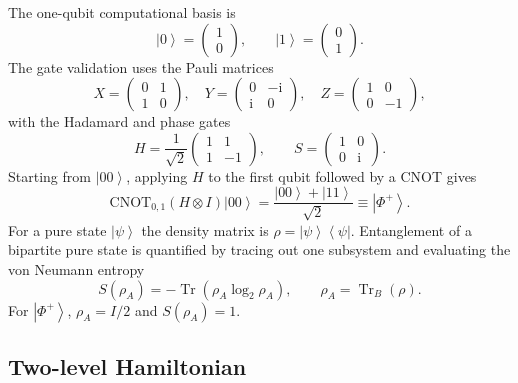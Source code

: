 \documentclass[10pt,a4paper]{article}
\newcommand{\ket}[1]{\left|#1\right\rangle}
\newcommand{\bra}[1]{\left\langle #1\right|}
\newcommand{\Tr}{\operatorname{Tr}}
\newcommand{\ii}{\mathrm{i}}
\begin{document}
The one-qubit computational basis is
\begin{equation}
\ket{0}=\begin{pmatrix}1\\0\end{pmatrix},\qquad \ket{1}=\begin{pmatrix}0\\1\end{pmatrix}.
\end{equation}
The gate validation uses the Pauli matrices
\begin{equation}
X=\begin{pmatrix}0&1\\1&0\end{pmatrix},\quad
Y=\begin{pmatrix}0&-\ii\\ \ii&0\end{pmatrix},\quad
Z=\begin{pmatrix}1&0\\0&-1\end{pmatrix},
\end{equation}
with the Hadamard and phase gates
\begin{equation}
H=\frac{1}{\sqrt{2}}\begin{pmatrix}1&1\\1&-1\end{pmatrix},\qquad
S=\begin{pmatrix}1&0\\0&\ii\end{pmatrix}.
\end{equation}
Starting from $\ket{00}$, applying $H$ to the first qubit followed by a CNOT gives
\begin{equation}
\mathrm{CNOT}_{0,1}(H\otimes I)\ket{00}=\frac{\ket{00}+\ket{11}}{\sqrt{2}}\equiv\ket{\Phi^+}.
\end{equation}
For a pure state $\ket{\psi}$ the density matrix is $\rho=\ket{\psi}\bra{\psi}$. Entanglement of a bipartite pure state is quantified by tracing out one subsystem and evaluating the von Neumann entropy
\begin{equation}
S(\rho_A)=-\Tr(\rho_A\log_2\rho_A),\qquad \rho_A=\Tr_B(\rho).
\label{eq:entropy}
\end{equation}
For $\ket{\Phi^+}$, $\rho_A=I/2$ and $S(\rho_A)=1$.

\subsection{Two-level Hamiltonian}
\end{document}

